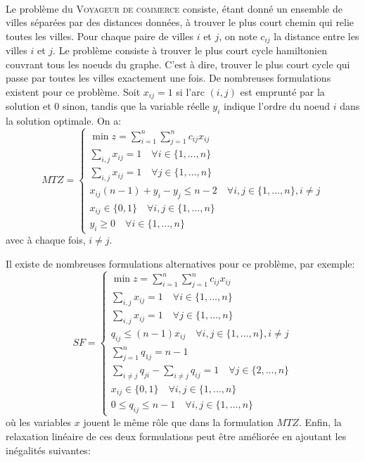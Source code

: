 \begin{td-exo}\,\\ %
	Le problème du \textsc{Voyageur de commerce} consiste, étant donné un ensemble de villes séparées par des distances données, à trouver le plus court chemin qui relie toutes les villes.
	Pour chaque paire de villes \(i\) et \(j\), on note \(c_{ij}\) la distance entre les villes \(i\) et \(j\).
	Le problème consiste à trouver le plus court cycle hamiltonien couvrant tous les noeuds du graphe.
	C'est à dire, trouver le plus court cycle qui passe par toutes les villes exactement une fois.
	De nombreuses formulations existent pour ce problème.
	Soit \(x_{ij} = 1\) si l'arc \((i,j)\) est emprunté par la solution et \(0\) sinon, tandis que la variable réelle \(y_i\) indique l'ordre du noeud \(i\) dans la solution optimale.
	On a:
	\begin{equation*}
		MTZ = 
		\begin{cases}
			\min z = \sum_{i=1}^n \sum_{j=1}^n c_{ij} x_{ij} \\
			\sum_{i,j} x_{ij} = 1 \quad \forall i \in \{1, \ldots, n\} \\
			\sum_{i,j} x_{ij} = 1 \quad \forall j \in \{1, \ldots, n\} \\
			x_{ij} (n-1) + y_i - y_j \leq n-2 \quad \forall i,j \in \{1, \ldots, n\}, i \neq j \\
			x_{ij} \in \{0,1\} \quad \forall i,j \in \{1, \ldots, n\} \\
			y_i \geq 0 \quad \forall i \in \{1, \ldots, n\}
		\end{cases}
	\end{equation*}
	avec à chaque fois, \(i \neq j\).

	Il existe de nombreuses formulations alternatives pour ce problème, par exemple:
	\begin{equation*}
		SF = 
		\begin{cases}
			\min z = \sum_{i=1}^n \sum_{j=1}^n c_{ij} x_{ij} \\
			\sum_{i,j} x_{ij} = 1 \quad \forall i \in \{1, \ldots, n\} \\
			\sum_{i,j} x_{ij} = 1 \quad \forall j \in \{1, \ldots, n\} \\
			q_{ij} \leq (n-1) x_{ij} \quad \forall i,j \in \{1, \ldots, n\}, i \neq j \\
			\sum_{j=1}^n q_{1j} = n-1 \\
			\sum_{i\neq j} q_{ji} - \sum_{i\neq j} q_{ij} = 1 \quad \forall j \in \{2, \ldots, n\} \\
			x_{ij} \in \{0,1\} \quad \forall i,j \in \{1, \ldots, n\} \\
			0 \leq q_{ij} \leq n-1 \quad \forall i,j \in \{1, \ldots, n\}
		\end{cases}
	\end{equation*}
	où les variables \(x\) jouent le même rôle que dans la formulation \(MTZ\).
	Enfin, la relaxation linéaire de ces deux formulations peut être améliorée en ajoutant les inégalités suivantes:
	

\end{td-exo}
